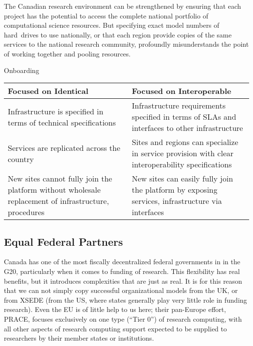 \documentclass[11pt]{article}
\begin{document}
The Canadian research environment can be strengthened by ensuring
that each project has the potential to access the complete national
portfolio of computational science resources.  But specifying exact
model numbers of hard~drives to use nationally, or that each region
provide copies of the same services to the national research
community, profoundly misunderstands the point of working together
and pooling resources.

Onboarding

\begin{table}[ht]
\centering
\small {\sffamily
{}
\begin{tabular}{p{2.5in}|p{2.5in}}
\textcolor{cdaRed}{\textbf{Focused on Identical}} & \textcolor{cdaRed}{\textbf{Focused on Interoperable}} \\
\hline
\hline
Infrastructure is specified in terms of technical specifications & Infrastructure requirements specified in terms of SLAs and interfaces to other infrastructure \\
Services are replicated across the country & Sites and regions can specialize in service provision with clear interoperability specifications \\
New sites cannot fully join the platform without wholesale replacement of infrastructure, procedures & New sites can easily fully join the platform by exposing services, infrastructure via interfaces \\
\hline
\end{tabular}
}
\end{table}

\subsection*{Equal Federal Partners}

Canada has one of the most fiscally decentralized federal governments
in in the G20, particularly when it comes to funding of research.  This
flexibility has real benefits, but it introduces complexities that
are just as real.  It is for this reason that we can not simply
copy successful organizational models from the UK, or from XSEDE
(from the US, where states generally play very little role in funding
research). Even the EU is of little help to us here; their pan-Europe
effort, PRACE, focuses exclusively on one type (\enquote{Tier 0})
of research computing, with all other aspects of research computing
support expected to be supplied to researchers by their member
states or institutions.
\end{document}
